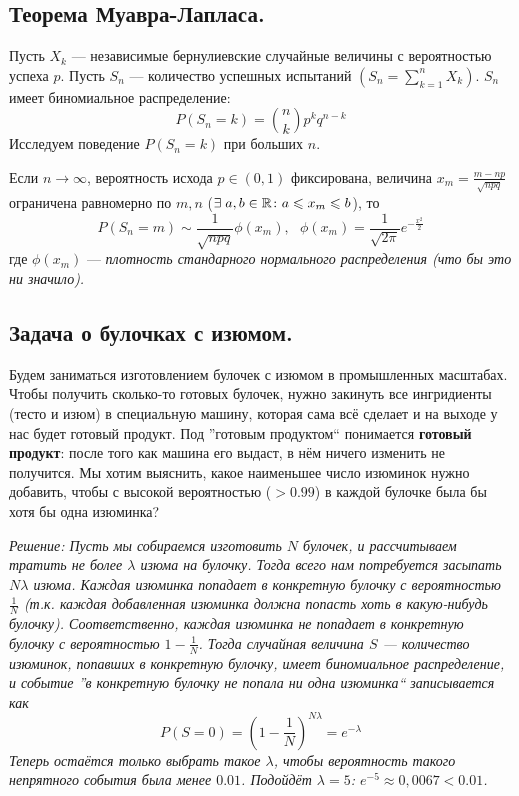 \subsection{Теорема Муавра-Лапласа.}
Пусть $X_k$ --- независимые бернулиевские случайные величины с вероятностью успеха $p$. Пусть $S_n$ --- количество успешных испытаний
$\left( S_n = \sum\limits_{k = 1}^{n} X_k \right)$. $S_n$ имеет биномиальное распределение:
\[
    P(S_n = k) = \binom{n}{k}p^{k}q^{n - k}
\]
Исследуем поведение $P(S_n = k)$ при больших $n$.
\begin{theorem}
    Если $n \to \infty$, вероятность исхода $p \in (0, 1)$ фиксирована, величина $x_m = \frac{m - np}{\sqrt{npq}}$ ограничена
    равномерно по $m, n$ ($\exists\;a, b \in \mathbb{R} \colon a \leqslant x_m \leqslant b$), то
    \[
        P(S_n = m) \sim \frac{1}{\sqrt{npq}}\phi(x_m), ~~~ \phi(x_m) = \frac{1}{\sqrt{2\pi}}e^{-\frac{x^2}{2}}
    \]
    где $\phi(x_m)$ --- \it{плотность стандарного нормального распределения} (что
    бы это ни значило).
\end{theorem}

\subsection{Задача о булочках с изюмом.}
\begin{problem}
    Будем заниматься изготовлением булочек с изюмом в промышленных масштабах. Чтобы получить сколько-то готовых
    булочек, нужно закинуть все ингридиенты (тесто и изюм) в специальную машину, которая сама всё сделает и на
    выходе у нас будет готовый продукт. Под ''готовым продуктом`` понимается \textbf{готовый продукт}: после
    того как машина его выдаст, в нём ничего изменить не получится. Мы хотим выяснить, какое наименьшее число
    изюминок нужно добавить, чтобы с высокой вероятностью ($> 0.99$) в каждой булочке была бы хотя бы одна изюминка?

    \it{Решение:} Пусть мы собираемся изготовить $N$ булочек, и рассчитываем тратить не более $\lambda$
    изюма на булочку. Тогда всего нам потребуется засыпать $N\lambda$ изюма. Каждая изюминка попадает в
    конкретную булочку с вероятностью $\frac{1}{N}$ (т.к. каждая добавленная изюминка должна попасть хоть
    в какую-нибудь булочку). Соответственно, каждая изюминка не попадает в конкретную булочку с вероятностью
    $1 - \frac{1}{N}$. Тогда случайная величина $S$ --- количество изюминок, попавших в конкретную булочку, имеет
    биномиальное распределение, и событие ''в конкретную булочку не попала ни одна изюминка`` записывается как
    \[
        P(S = 0) = \left( 1 - \frac{1}{N} \right)^{N\lambda} = e^{-\lambda}
    \]
    Теперь остаётся только выбрать такое $\lambda$, чтобы вероятность такого непрятного события была менее $0.01$.
    Подойдёт $\lambda = 5$: $e^{-5} \approx 0,0067 < 0.01$.
\end{problem}

